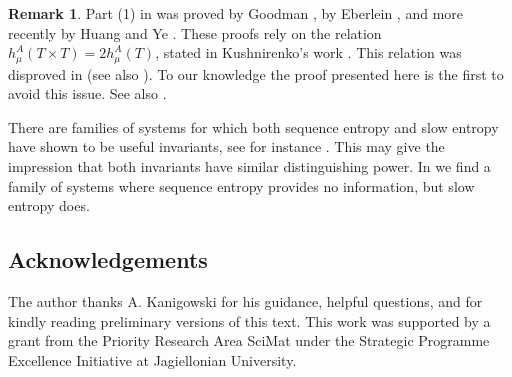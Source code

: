 \documentclass[a4paper,oneside]{amsart}
\renewcommand{\(}{\begin{dmath*}}
\renewcommand{\)}{\end{dmath*}}
\theoremstyle{definition}
\newtheorem{remark}{Remark}
\begin{document}

\begin{remark} 
    Part (1) in  was proved by Goodman \cite[Theorem 3.1]{goodman_topological_1974}, by Eberlein \cite[Theorem 4.3]{eberlein_topological_nodate}, and more recently by Huang and Ye \cite[Theorem 2.6]{huang_combinatorial_2009}. These proofs rely on the relation $h^{A}_{\mu}(T\times T)=2 h^{A}_{\mu}(T)$, stated in Kushnirenko's work \cite{kushnirenko_metric_1967}. This relation was  disproved in \cite{lemanczyk_sequence_1985} (see also \cite[Section 4]{gogolev_survey_2024}). To our knowledge the proof presented here is the first to avoid this issue. See also .
\end{remark}

There are families of systems for which both sequence entropy and slow entropy have shown to be useful invariants, see for instance \cite{kanigowski_slow_2019}. This may give the impression that both invariants have similar distinguishing power. In  we find a family of systems where sequence entropy provides no information, but slow entropy does.

\subsection*{Acknowledgements}
The author thanks A. Kanigowski for his guidance, helpful questions, and for kindly reading preliminary versions of this text. This work was supported by a grant from the Priority Research Area SciMat under the Strategic Programme Excellence Initiative at Jagiellonian University.
\end{document}
